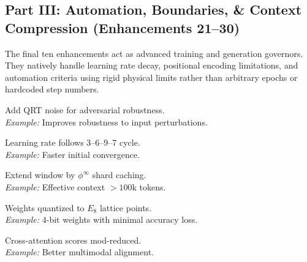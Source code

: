 \subsection{Part III\@: Automation, Boundaries, \& Context Compression (Enhancements 21--30)}

The final ten enhancements act as advanced training and generation governors. They natively handle learning rate decay, positional encoding limitations, and automation criteria using rigid physical limits rather than arbitrary epochs or hardcoded step numbers.

\begin{tcolorbox}[
	enhanced,
	colback=nrccream!85!white,
	colframe=nrcblue,
	boxrule=0.5mm,
	title=\textbf{21. QRT noise injection}
	]
	Add QRT noise for adversarial robustness. \\
	\textit{Example:} Improves robustness to input perturbations.
\end{tcolorbox}

\begin{tcolorbox}[
	enhanced,
	colback=nrccream!85!white,
	colframe=nrcblue,
	boxrule=0.5mm,
	title=\textbf{22. 3--6--9--7 cycle warm-up schedule}
	]
	Learning rate follows 3--6--9--7 cycle. \\
	\textit{Example:} Faster initial convergence.
\end{tcolorbox}

\begin{tcolorbox}[
	enhanced,
	colback=nrccream!85!white,
	colframe=nrcblue,
	boxrule=0.5mm,
	title=\textbf{23. $\phi^\infty$ context window extension}
	]
	Extend window by $\phi^\infty$ shard caching. \\
	\textit{Example:} Effective context $>100$k tokens.
\end{tcolorbox}

\begin{tcolorbox}[
	enhanced,
	colback=nrccream!85!white,
	colframe=nrcblue,
	boxrule=0.5mm,
	title=\textbf{24. $E_8$ lattice quantization for weights}
	]
	Weights quantized to $E_8$ lattice points. \\
	\textit{Example:} 4-bit weights with minimal accuracy loss.
\end{tcolorbox}

\begin{tcolorbox}[
	enhanced,
	colback=nrccream!85!white,
	colframe=nrcblue,
	boxrule=0.5mm,
	title=\textbf{25. TTT cross-attention with $\phi$-mod reduction}
	]
	Cross-attention scores mod-reduced. \\
	\textit{Example:} Better multimodal alignment.
\end{tcolorbox}

